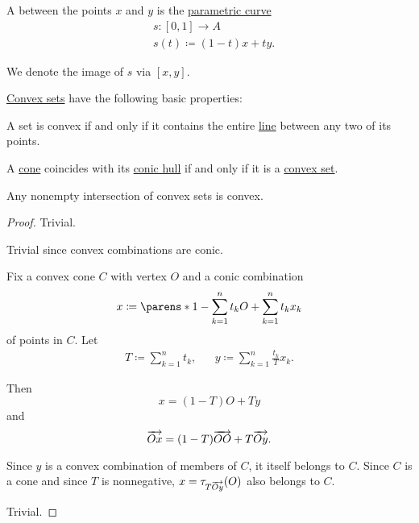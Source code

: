 \begin{definition}\label{def:line_segment}
  A  between the points \( x \) and \( y \) is the \hyperref[def:parametric_curve]{parametric curve}
  \begin{equation*}
    \begin{aligned}
      &s: [0, 1] \to A \\
      &s(t) \coloneqq (1 - t) x + t y.
    \end{aligned}
  \end{equation*}

  We denote the image of \( s \) via \( [x, y] \).
\end{definition}

\begin{proposition}\label{thm:def:convex_hull}
  \hyperref[def:convex_hull]{Convex sets} have the following basic properties:

  \begin{thmenum}
     A set is convex if and only if it contains the entire \hyperref[def:line_segment]{line} between any two of its points.

     A \hyperref[def:geometric_cone]{cone} coincides with its \hyperref[def:convex_hull]{conic hull} if and only if it is a \hyperref[def:convex_hull]{convex set}.

     Any nonempty intersection of convex sets is convex.
  \end{thmenum}
\end{proposition}
\begin{proof}
   Trivial.

  \SufficiencySubProof* Trivial since convex combinations are conic.

  \NecessitySubProof* Fix a convex cone \( C \) with vertex \( O \) and a conic combination
  \begin{equation*}
    x \coloneqq \parens*{ 1 - \sum_{k=1}^n t_k } O + \sum_{k=1}^n t_k x_k
  \end{equation*}
  of points in \( C \). Let
  \begin{align*}
    T \coloneqq \sum_{k=1}^n t_k,
    &&
    y \coloneqq \sum_{k=1}^n \frac {t_k} T x_k.
  \end{align*}

  Then
  \begin{equation*}
    x = (1 - T) O + T y
  \end{equation*}
  and
  \begin{equation*}
    \overrightarrow{Ox} = (1 - T) \overrightarrow{OO} + T \overrightarrow{Oy}.
  \end{equation*}

  Since \( y \) is a convex combination of members of \( C \), it itself belongs to \( C \). Since \( C \) is a cone and since \( T \) is nonnegative, \( x = \tau_{T \overrightarrow{Oy}}(O) \) also belongs to \( C \).

   Trivial.
\end{proof}

